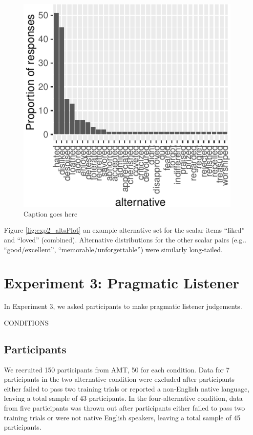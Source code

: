 \documentclass[10pt, letterpaper]{article}
\newenvironment{CodeChunk}{}{}
\begin{document}
\begin{CodeChunk}
\begin{figure}[t]

{\centering \includegraphics{figs/exp2_altsPlot_likedLoved-1} 

}

\caption[Caption goes here]{Caption goes here}\label{fig:exp2_altsPlot_likedLoved}
\end{figure}
\end{CodeChunk}

Figure \ref{fig:exp2_altsPlot} an example alternative set for the scalar
items ``liked'' and ``loved'' (combined). Alternative distributions for
the other scalar pairs (e.g.. ``good/excellent'',
``memorable/unforgettable'') were similarly long-tailed.

\section{Experiment 3: Pragmatic
Listener}\label{experiment-3-pragmatic-listener}

In Experiment 3, we asked participants to make pragmatic listener
judgements.

CONDITIONS

\subsection{Participants}\label{participants-2}

We recruited 150 participants from AMT, 50 for each condition. Data for
7 participants in the two-alternative condition were excluded after
participants either failed to pass two training trials or reported a
non-English native language, leaving a total sample of 43 participants.
In the four-alternative condition, data from five participants was
thrown out after participants either failed to pass two training trials
or were not native English speakers, leaving a total sample of 45
participants.
\end{document}
